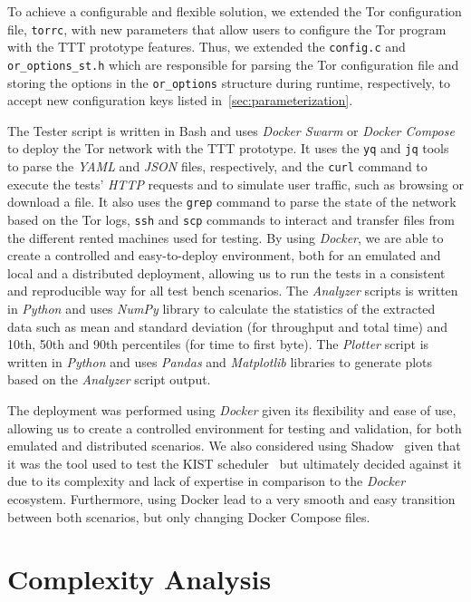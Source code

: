 To achieve a configurable and flexible solution, we extended the Tor configuration file, \texttt{torrc}, with new parameters that allow users to configure the Tor program with the TTT prototype features. Thus, we extended the 
\texttt{config.c} and \texttt{or\_options\_st.h} which are responsible for parsing the Tor configuration file and storing the options in the \texttt{or\_options} structure during runtime, respectively, to accept new configuration keys listed in~\autoref{sec:parameterization}.

The Tester script is written in Bash and uses \textit{Docker Swarm} or \textit{Docker Compose} to deploy the Tor network with the TTT prototype. It uses the \texttt{yq} and \texttt{jq} tools to parse the \textit{YAML} and \textit{JSON} files, respectively, and the \texttt{curl} command to execute the tests' \textit{HTTP} requests and to simulate user traffic, such as browsing or download a file. It also uses the \texttt{grep} command to parse the state of the network based on the Tor logs, \texttt{ssh} and \texttt{scp} commands to interact and transfer files from the different rented machines used for testing. By using \textit{Docker}, we are able to create a controlled and easy-to-deploy environment, both for an emulated and local and a distributed deployment, allowing us to run the tests in a consistent and reproducible way for all test bench scenarios. 
The \textit{Analyzer} scripts is written in \textit{Python} and uses \textit{NumPy} library to calculate the statistics of the extracted data such as mean and standard deviation (for throughput and total time) and 10th, 50th and 90th percentiles (for time to first byte).   
The \textit{Plotter} script is written in \textit{Python} and uses \textit{Pandas} and \textit{Matplotlib} libraries to generate plots based on the \textit{Analyzer} script output.

The deployment was performed using \textit{Docker} given its flexibility and ease of use, allowing us to create a controlled environment for testing and validation, for both emulated and distributed scenarios. We also considered using Shadow~\cite{shadow-ndss2012} given that it was the tool used to test the KIST scheduler~\cite{KIST} but ultimately decided against it due to its complexity and lack of expertise in comparison to the \textit{Docker} ecosystem. Furthermore, using Docker lead to a very smooth and easy transition between both scenarios, but only changing Docker Compose files. 


\section{Complexity Analysis}\label{sec:complexity_analysis}

